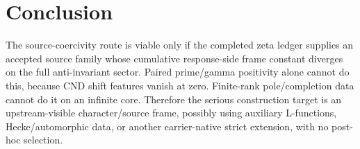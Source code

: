 \documentclass[11pt]{article}
\begin{document}
\section{Conclusion}
The source-coercivity route is viable only if the completed zeta ledger supplies an accepted source family whose cumulative response-side frame constant diverges on the full anti-invariant sector.  Paired prime/gamma positivity alone cannot do this, because CND shift features vanish at zero.  Finite-rank pole/completion data cannot do it on an infinite core.  Therefore the serious construction target is an upstream-visible character/source frame, possibly using auxiliary L-functions, Hecke/automorphic data, or another carrier-native strict extension, with no post-hoc selection.
\end{document}
